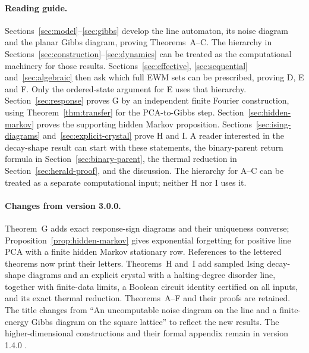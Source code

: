\paragraph{Reading guide.}
Sections~\ref{sec:model}--\ref{sec:gibbs} develop the line automaton, its noise diagram and the planar Gibbs diagram, proving Theorems~A--C. The hierarchy in Sections~\ref{sec:construction}--\ref{sec:dynamics} can be treated as the computational machinery for those results. Sections~\ref{sec:effective}, \ref{sec:sequential} and~\ref{sec:algebraic} then ask which full EWM sets can be prescribed, proving D, E and F. Only the ordered-state argument for E uses that hierarchy. Section~\ref{sec:response} proves G by an independent finite Fourier construction, using Theorem~\ref{thm:transfer} for the PCA-to-Gibbs step. Section~\ref{sec:hidden-markov} proves the supporting hidden Markov proposition. Sections~\ref{sec:ising-diagrams} and~\ref{sec:explicit-crystal} prove H and I. A reader interested in the decay-shape result can start with these statements, the binary-parent return formula in Section~\ref{sec:binary-parent}, the thermal reduction in Section~\ref{sec:herald-proof}, and the discussion. The hierarchy for A--C can be treated as a separate computational input; neither H nor I uses it.

\paragraph{Changes from version 3.0.0.}
Theorem~G adds exact response-sign diagrams and their uniqueness converse; Proposition~\ref{prop:hidden-markov} gives exponential forgetting for positive line PCA with a finite hidden Markov stationary row. References to the lettered theorems now print their letters. Theorems~H and~I add sampled Ising decay-shape diagrams and an explicit crystal with a halting-degree disorder line, together with finite-data limits, a Boolean circuit identity certified on all inputs, and its exact thermal reduction. Theorems~A--F and their proofs are retained. The title changes from ``An uncomputable noise diagram on the line and a finite-energy Gibbs diagram on the square lattice'' to reflect the new results. The higher-dimensional constructions and their formal appendix remain in version 1.4.0 \cite{dmNoise}.
